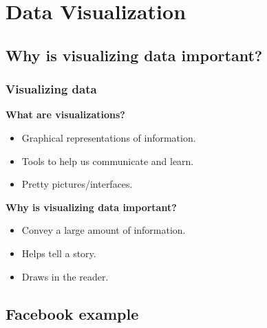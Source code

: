 \documentclass{beamer} %
\newcommand{\1}{\mathbb{1}}
\begin{document}


\section[Data Visualization]{Data Visualization}

\subsection[Why is visualizing data important?]{Why is visualizing data important?}

\begin{frame}[t]\frametitle{Visualizing data}
\begin{center}
{\bf{What are visualizations?}}
\vspace{2 mm}
\begin{itemize}
	\item Graphical representations of information.
	\item Tools to help us communicate and learn.
	\item Pretty pictures/interfaces.
\end{itemize}
\end{center}
\vspace{5 mm}
\pause

\begin{center}
{\bf{Why is visualizing data important?}}
\vspace{2 mm}

\begin{itemize}
	\item Convey a large amount of information.
	\item Helps tell a story.
	\item Draws in the reader.
\end{itemize}
\end{center}

\end{frame}


\subsection[Visualizing data - Facebook]{Facebook example}
\end{document}
